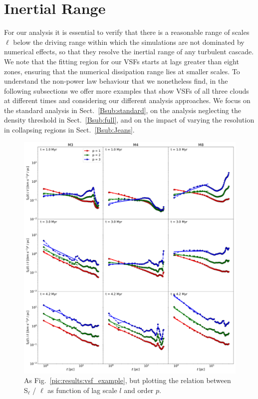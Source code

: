 
\section{Inertial Range}\label{appInertial}


For our analysis it is essential to verify that there is a reasonable range of scales $\ell$ below the driving range within which the simulations are not dominated by numerical effects, so that they resolve the inertial range of any turbulent cascade.  
We note that the fitting region for our VSFs starts at lags greater than eight zones, ensuring that the numerical dissipation range lies at smaller scales.
To understand the non-power law behaviour that we nonetheless find, in the following subsections we offer more examples that show VSFs of all three clouds at different times and considering our different analysis approaches. 
We focus on the standard analysis in Sect.~\ref{Bsub:standard}, on the
analysis neglecting the density threshold in Sect.~\ref{Bsub:full},
and on the impact of varying the resolution in collapsing regions in Sect.~\ref{Bsub:Jeans}.

 	
\begin{figure}
    \centering
    \includegraphics[width=\textwidth]{app_examples_wthres_sl_l.pdf}
    \caption{
        As Fig.~\ref{pic:results:vsf_example}, but plotting the relation between S$_{\ell}$ / $\ell$ as function of lag scale $l$ and order $p$.
    }
    \label{pic:appInertial:examples_with_threshold_sl_vs_l}
\end{figure}
 	
